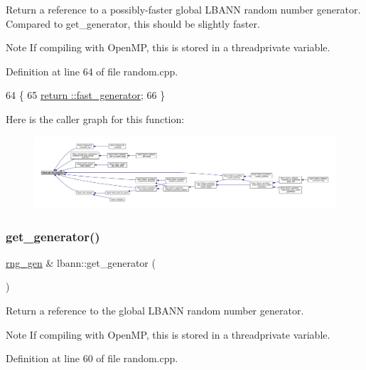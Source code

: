 Return a reference to a possibly-\/faster global L\+B\+A\+NN random number generator. Compared to get\+\_\+generator, this should be slightly faster. \begin{DoxyNote}{Note}
If compiling with Open\+MP, this is stored in a threadprivate variable. 
\end{DoxyNote}


Definition at line 64 of file random.\+cpp.


\begin{DoxyCode}
64                                    \{
65   \hyperlink{namespaceanonymous__namespace_02random_8cpp_03_a349f572cec05cd0e2469b799774a8602}{return ::fast\_generator};
66 \}
\end{DoxyCode}
Here is the caller graph for this function\+:\nopagebreak
\begin{figure}[H]
\begin{center}
\leavevmode
\includegraphics[width=350pt]{namespacelbann_ae6ce9c2fdec6f81803f6b1a6555c31c5_icgraph}
\end{center}
\end{figure}
\mbox{\label{namespacelbann_a4fea7ba21017b49d1e34394b4c20c764}} 
\subsubsection{\texorpdfstring{get\+\_\+generator()}{get\_generator()}}
{\footnotesize\ttfamily \hyperlink{namespacelbann_aab7fa584bac85b9085aa8b8c5a888356}{rng\+\_\+gen} \& lbann\+::get\+\_\+generator (\begin{DoxyParamCaption}{ }\end{DoxyParamCaption})}

Return a reference to the global L\+B\+A\+NN random number generator. \begin{DoxyNote}{Note}
If compiling with Open\+MP, this is stored in a threadprivate variable. 
\end{DoxyNote}


Definition at line 60 of file random.\+cpp.


